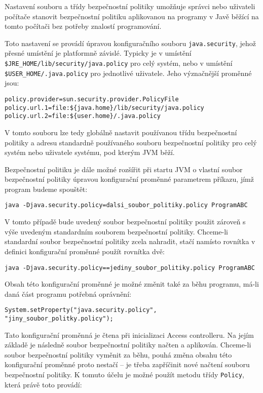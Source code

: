 Nastavení souboru a třídy bezpečnostní politiky umožňuje správci nebo uživateli počítače stanovit bezpečnostní politiku aplikovanou na programy v Javě běžící na tomto počítači bez potřeby znalostí programování.

Toto nastavení se provádí úpravou konfiguračního souboru {\tt java.security}, jehož přesné umístění je platformně závislé. Typicky je v umístění {\tt \$JRE\_HOME/lib/security/java.policy} pro celý systém, nebo v umístění {\tt \$USER\_HOME/.java.policy} pro jednotlivé uživatele. \cite{refSecurity}
Jeho význačnější proměnné jsou: \cite[5.3.1]{oaks}

\begin{verbatim}
policy.provider=sun.security.provider.PolicyFile
policy.url.1=file:${java.home}/lib/security/java.policy
policy.url.2=file:${user.home}/.java.policy
\end{verbatim}

V tomto souboru lze tedy globálně nastavit používanou třídu bezpečnostní politiky a adresu standardně používaného souboru bezpečnostní politiky pro celý systém nebo uživatele systému, pod kterým JVM běží.

Bezpečnostní politiku je dále možné rozšířit při startu JVM o vlastní soubor bezpečnostní politiky úpravou konfigurační proměnné parametrem příkazu, jímž program budeme spouštět: \cite[5.3.1]{oaks}

\begin{verbatim}
java -Djava.security.policy=dalsi_soubor_politiky.policy ProgramABC
\end{verbatim}

V tomto případě bude uvedený soubor bezpečnostní politiky použit zároveň s výše uvedeným standardním souborem bezpečnostní politiky. Chceme-li standardní soubor bezpečnostní politiky zcela nahradit, stačí namísto rovnítka v definici konfigurační proměnné použít rovnítka dvě: \cite[5.3.1]{oaks}

\begin{verbatim}
java -Djava.security.policy==jediny_soubor_politiky.policy ProgramABC
\end{verbatim}

Obsah této konfigurační proměnné je možné změnit také za běhu programu, má-li daná část programu potřebná oprávnění:

\begin{verbatim}
System.setProperty("java.security.policy", "jiny_soubor_politky.policy");
\end{verbatim}

Tato konfigurační proměnná je čtena při inicializaci Access controlleru. Na jejím základě je následně soubor bezpečnostní politiky načten a aplikován. Chceme-li soubor bezpečnostní politiky vyměnit za běhu, pouhá změna obsahu této konfigurační proměnné proto nestačí -- je třeba zapříčinit nové načtení souboru bezpečnostní politiky. K tomuto účelu je možné použít metodu třídy {\tt Policy}, která právě toto provádí:

